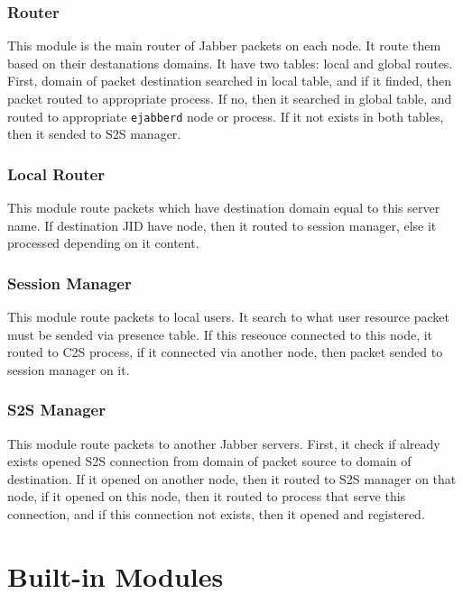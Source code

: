 \documentclass[10pt]{article}
\newcommand{\ejabberd}{\texttt{ejabberd}}
\newcommand{\Jabber}{Jabber}
\begin{document}
\subsubsection{Router}

This module is the main router of \Jabber{} packets on each node.  It route
them based on their destanations domains.  It have two tables: local and global
routes.  First, domain of packet destination searched in local table, and if it
finded, then packet routed to appropriate process.  If no, then it searched in
global table, and routed to appropriate \ejabberd{} node or process.  If it not
exists in both tables, then it sended to S2S manager.


\subsubsection{Local Router}

This module route packets which have destination domain equal to this server
name.  If destination JID have node, then it routed to session manager, else it
processed depending on it content.


\subsubsection{Session Manager}

This module route packets to local users.  It search to what user resource
packet must be sended via presence table.  If this reseouce connected to this
node, it routed to C2S process, if it connected via another node, then packet
sended to session manager on it.


\subsubsection{S2S Manager}

This module route packets to another \Jabber{} servers.  First, it check if
already exists opened S2S connection from domain of packet source to domain of
destination.  If it opened on another node, then it routed to S2S manager on
that node, if it opened on this node, then it routed to process that serve this
connection, and if this connection not exists, then it opened and registered.


\section{Built-in Modules}
\label{sec:modules}
\end{document}
